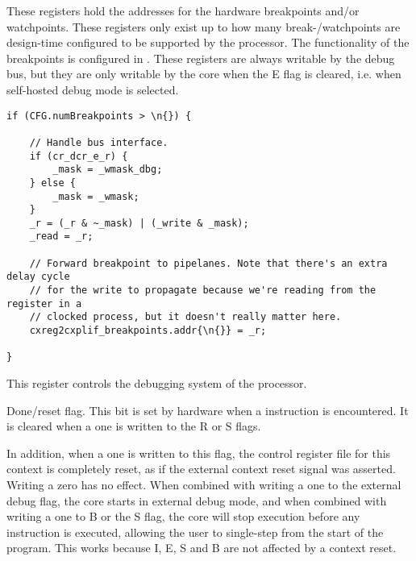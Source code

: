 
These registers hold the addresses for the hardware breakpoints and/or
watchpoints. These registers only exist up to how many break-/watchpoints are
design-time configured to be supported by the processor. The functionality of
the breakpoints is configured in . These registers are always writable
by the debug bus, but they are only writable by the core when the E flag is
cleared, i.e. when self-hosted debug mode is selected.

\declaration{}
\implementation{}
\begin{lstlisting}
if (CFG.numBreakpoints > \n{}) {
    
    // Handle bus interface.
    if (cr_dcr_e_r) {
        _mask = _wmask_dbg;
    } else {
        _mask = _wmask;
    }
    _r = (_r & ~_mask) | (_write & _mask);
    _read = _r;
    
    // Forward breakpoint to pipelanes. Note that there's an extra delay cycle
    // for the write to propagate because we're reading from the register in a
    // clocked process, but it doesn't really matter here.
    cxreg2cxplif_breakpoints.addr{\n{}} = _r;
    
}
\end{lstlisting}


This register controls the debugging system of the \rvex{} processor.

Done/reset flag. This bit is set by hardware when a  instruction is 
encountered. It is cleared when a one is written to the R or S flags.

In addition, when a one is written to this flag, the control register file for 
this context is completely reset, as if the external context reset signal was 
asserted. Writing a zero has no effect. When combined with writing a one to the 
external debug flag, the core starts in external debug mode, and when combined 
with writing a one to B or the S flag, the core will stop execution before any 
instruction is executed, allowing the user to single-step from the start of the 
program. This works because I, E, S and B are not affected by a context reset.

